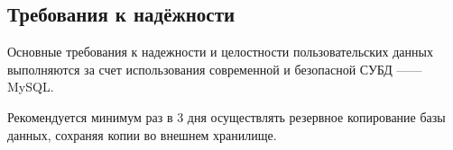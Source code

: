 \documentclass[other-needs.tex]{subfiles}
\begin{document}
\subsection{Требования к надёжности}
\par
Основные требования к надежности и целостности пользовательских данных выполняются 
за счет использования современной и безопасной СУБД —— MySQL.
\par
Рекомендуется минимум раз в 3 дня осуществлять резервное копирование базы данных, сохраняя копии во внешнем хранилище.
\end{document}
